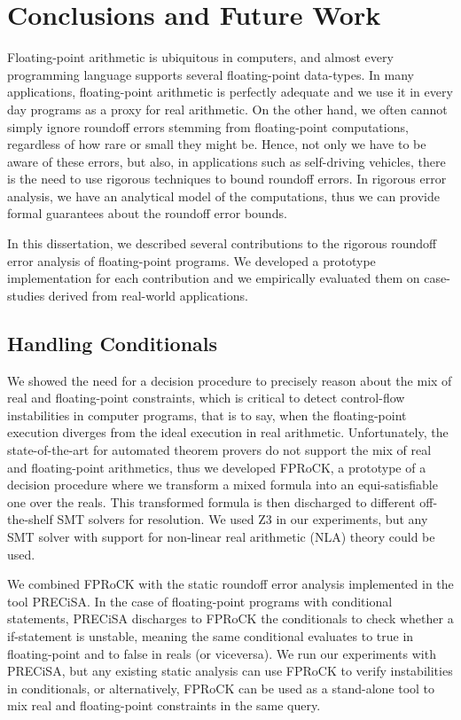 
\chapter{Conclusions and Future Work}
\label{sec:conclusion}
%
\setupuuchapterbib
%
Floating-point arithmetic is ubiquitous in computers, and almost every programming language supports several floating-point data-types.
%
In many applications, floating-point arithmetic is perfectly adequate and we use it in every day programs as a proxy for real arithmetic.
%
On the other hand, we often cannot simply ignore roundoff errors stemming from floating-point computations, regardless of how rare or small they might be.
%
Hence, not only we have to be aware of these errors, but also, in applications such as self-driving vehicles, there is the need to use rigorous techniques to bound roundoff errors. 
%
In rigorous error analysis, we have an analytical model of the computations, thus we can provide formal guarantees about the roundoff error bounds.
%

In this dissertation, we described several contributions to the rigorous roundoff error analysis of floating-point programs.
%
We developed a prototype implementation for each contribution and we empirically evaluated them on case-studies derived from real-world applications.
%

\section{Handling Conditionals}
%
We showed the need for a decision procedure to precisely reason about the mix of real and floating-point constraints, which is critical to detect control-flow instabilities in computer programs, that is to say, when the floating-point execution diverges from the ideal execution in real arithmetic.
%
Unfortunately, the state-of-the-art for automated theorem provers do not support the mix of real and floating-point arithmetics, thus we developed FPRoCK, a prototype of a decision procedure where we transform a mixed formula
into an equi-satisfiable one over the reals.
%
This transformed formula is then discharged to different off-the-shelf SMT solvers for resolution.
%
We used Z3 in our experiments, but any SMT solver with support for non-linear real arithmetic (NLA) theory could be used.
%

We combined FPRoCK with the static roundoff error analysis implemented in the tool PRECiSA.
%
In the case of floating-point programs with conditional statements, PRECiSA discharges to FPRoCK the conditionals to check whether a if-statement is unstable, meaning the same conditional evaluates to true in floating-point and to false in reals (or viceversa).
%
We run our experiments with PRECiSA, but any existing static analysis can use FPRoCK to verify instabilities in conditionals, or alternatively, FPRoCK can be used as a stand-alone tool to mix real and floating-point constraints in the same query.
%

